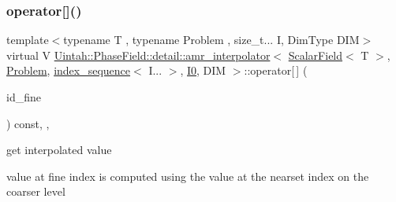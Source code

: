 \mbox{\label{classUintah_1_1PhaseField_1_1detail_1_1amr__interpolator_3_01ScalarField_3_01T_01_4_00_01Problem64f2458f98b03e27672a091eecc4b696_aafa653b8bf8b3fae50db0042f5bbbcfc}} 
\subsubsection{\texorpdfstring{operator[]()}{operator[]()}\hspace{0.1cm}{\footnotesize\ttfamily [2/2]}}
{\footnotesize\ttfamily template$<$typename T , typename Problem , size\+\_\+t... I, Dim\+Type D\+IM$>$ \\
virtual V \hyperlink{classUintah_1_1PhaseField_1_1detail_1_1amr__interpolator}{Uintah\+::\+Phase\+Field\+::detail\+::amr\+\_\+interpolator}$<$ \hyperlink{structUintah_1_1PhaseField_1_1ScalarField}{Scalar\+Field}$<$ T $>$, \hyperlink{classUintah_1_1PhaseField_1_1Problem}{Problem}, \hyperlink{namespaceUintah_1_1PhaseField_a237de804d99512e50613aff7c94a9461}{index\+\_\+sequence}$<$ I... $>$, \hyperlink{namespaceUintah_1_1PhaseField_a547ce3002aa97fbd3ef3192a6eec8406abdd8ebcbdfd71d1125937e3012dc45fb}{I0}, D\+IM $>$\+::operator\mbox{[}$\,$\mbox{]} (\begin{DoxyParamCaption}\item[{const Int\+Vector \&}]{id\+\_\+fine }\end{DoxyParamCaption}) const\hspace{0.3cm}{\ttfamily [inline]}, {\ttfamily [override]}, {\ttfamily [virtual]}}



get interpolated value 

value at fine index is computed using the value at the nearset index on the coarser level


